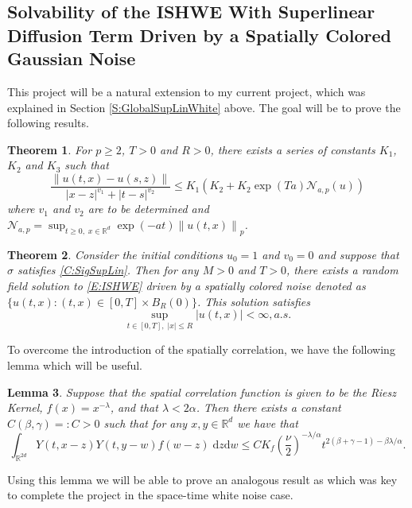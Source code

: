 \documentclass[a4paper,11pt]{article}
\numberwithin{equation}{section}
\theoremstyle{plain}
\newtheorem{theorem}{Theorem}[section]
\newtheorem{lemma}[theorem]{Lemma}
\theoremstyle{definition}
\newcommand{\ud}{\ensuremath{\mathrm{d} }}
\newcommand{\Norm}[1]{\left\|  #1   \right\|}
\newcommand{\R}{\mathbb{R}}
\numberwithin{NQ}{section}
\numberwithin{LQ}{section}
\numberwithin{ZQ}{section}
\begin{document}
\subsection{Solvability of the ISHWE With Superlinear Diffusion Term Driven by a Spatially Colored Gaussian Noise}
This project will be a natural extension to my current project, which was explained in Section \ref{S:GlobalSupLinWhite} above. The goal will be to prove the following results.

	\begin{theorem}
For $p \ge 2$, $T>0$ and $R>0$, there exists a series of constants $K_1$, $K_2$ and $K_3$ such that 
	\[
		\frac{\Norm{u(t,x)-u(s,z)}}{|x-z|^{v_1} + |t-s|^{v_2}} \le K_1\left(K_2 + K_2\exp(T a) \mathcal{N}_{a,p}(u)\right)
	\]
where $v_1$ and $v_2$ are to be determined and $\mathcal{N}_{a,p} = \sup_{t \ge 0, \; x \in \R^d} \exp(-at)\Norm{u(t,x)}_p$.
	\end{theorem}

	\begin{theorem}
Consider the initial conditions $u_0=1$ and $v_0=0$ and suppose that $\sigma$ satisfies \eqref{C:SigSupLin}. Then for any $M>0$ and $T>0$, there exists a random field solution to \eqref{E:ISHWE} driven by a spatially colored noise denoted as $\{ u(t,x): (t,x) \in [0,T]\times B_R(0) \}$. This solution satisfies 
	\begin{equation}
	\sup_{t\in[0,T],\; |x| \le R} |u(t,x)| < \infty, a.s.
	\end{equation}
\end{theorem}

To overcome the introduction of the spatially correlation, we have the following lemma which will be useful.  
	\begin{lemma}
	\label{L:intYfYbdd}
	Suppose that the spatial correlation function is given to be the Riesz Kernel, $f(x) = x^{-\lambda}$, and that $\lambda < 2\alpha$. Then there exists a constant $C(\beta,\gamma) =: C >0$ such that for any $x,y \in \R^d$ we have that 
	\begin{equation}
	\label{E:YYfBdd}
	\int_{\R^{2d}} Y(t,x-z)Y(t,y-w)f(w-z) \; \ud z \ud w \le C K_f \left( \frac{\nu}{2} \right)^{-\lambda / \alpha} t^{2(\beta + \gamma -1)-\beta \lambda / \alpha}.
	\end{equation}
\end{lemma}

Using this lemma we will be able to prove an analogous result as \cite[Proposition 4.4]{SoleMillet2021} which was key to complete the project in the space-time white noise case. 
\end{document}
